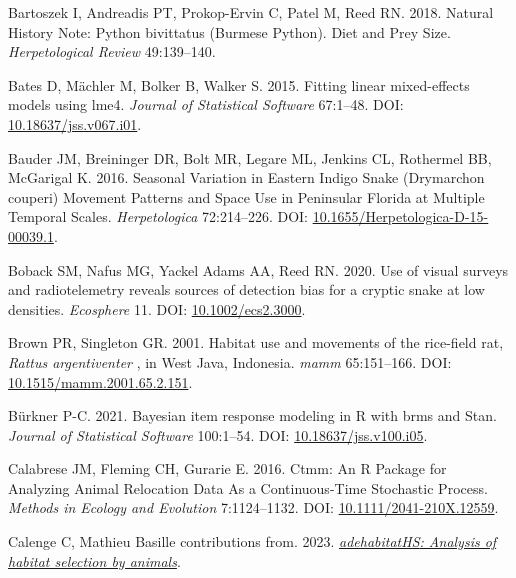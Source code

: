 \documentclass[10pt,a4paper]{article}
\newlength{\cslhangindent}
\newenvironment{CSLReferences}[2] %
 {\begin{list}{}{%
  \setlength{\itemindent}{0pt}
  \setlength{\leftmargin}{0pt}
  \setlength{\parsep}{0pt}
  \ifodd #1
   \setlength{\leftmargin}{\cslhangindent}
   \setlength{\itemindent}{-1\cslhangindent}
  \fi
  \setlength{\itemsep}{#2\baselineskip}}}
 {\end{list}}
\begin{document}
\begin{CSLReferences}{1}{0}
Bartoszek I, Andreadis PT, Prokop-Ervin C, Patel M, Reed RN. 2018. Natural {History} {Note}: {Python} bivittatus ({Burmese} {Python}). {Diet} and {Prey} {Size}. \emph{Herpetological Review} 49:139--140.

Bates D, Mächler M, Bolker B, Walker S. 2015. Fitting linear mixed-effects models using {lme4}. \emph{Journal of Statistical Software} 67:1--48. DOI: \href{https://doi.org/10.18637/jss.v067.i01}{10.18637/jss.v067.i01}.

Bauder JM, Breininger DR, Bolt MR, Legare ML, Jenkins CL, Rothermel BB, McGarigal K. 2016. Seasonal {Variation} in {Eastern} {Indigo} {Snake} ({Drymarchon} couperi) {Movement} {Patterns} and {Space} {Use} in {Peninsular} {Florida} at {Multiple} {Temporal} {Scales}. \emph{Herpetologica} 72:214--226. DOI: \href{https://doi.org/10.1655/Herpetologica-D-15-00039.1}{10.1655/Herpetologica-D-15-00039.1}.

Boback SM, Nafus MG, Yackel Adams AA, Reed RN. 2020. Use of visual surveys and radiotelemetry reveals sources of detection bias for a cryptic snake at low densities. \emph{Ecosphere} 11. DOI: \href{https://doi.org/10.1002/ecs2.3000}{10.1002/ecs2.3000}.

Brown PR, Singleton GR. 2001. Habitat use and movements of the rice-field rat, \emph{{Rattus} argentiventer} , in {West} {Java}, {Indonesia}. \emph{mamm} 65:151--166. DOI: \href{https://doi.org/10.1515/mamm.2001.65.2.151}{10.1515/mamm.2001.65.2.151}.

Bürkner P-C. 2021. Bayesian item response modeling in {R} with {brms} and {Stan}. \emph{Journal of Statistical Software} 100:1--54. DOI: \href{https://doi.org/10.18637/jss.v100.i05}{10.18637/jss.v100.i05}.

Calabrese JM, Fleming CH, Gurarie E. 2016. Ctmm: An {R} {Package} for {Analyzing} {Animal} {Relocation} {Data} {As} a {Continuous}-{Time} {Stochastic} {Process}. \emph{Methods in Ecology and Evolution} 7:1124--1132. DOI: \href{https://doi.org/10.1111/2041-210X.12559}{10.1111/2041-210X.12559}.

Calenge C, Mathieu Basille contributions from. 2023. \emph{\href{https://CRAN.R-project.org/package=adehabitatHS}{{adehabitatHS}: Analysis of habitat selection by animals}}.


\end{CSLReferences}
\end{document}
